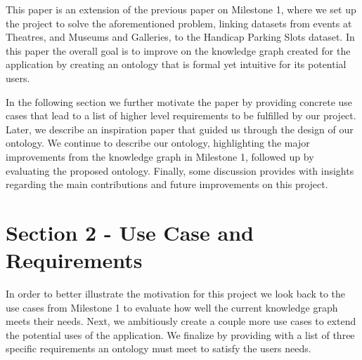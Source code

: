 \documentclass[runningheads,a4paper]{../../StyleFiles/llncs}
\begin{document}
This paper is an extension of the previous paper on Milestone 1, where we set up the project to solve the aforementioned problem, linking datasets from events at Theatres, and Museums and Galleries, to the Handicap Parking Slots dataset. In this paper the overall goal is to improve on the knowledge graph created for the application by creating an ontology that is formal yet intuitive for its potential users.

In the following section we further motivate the paper by providing concrete use cases that lead to a list of higher level requirements to be fulfilled by our project. Later, we describe an inspiration paper that guided us through the design of our ontology. We continue to describe our ontology, highlighting the major improvements from the knowledge graph in Milestone 1, followed up by evaluating the proposed ontology. Finally, some discussion provides with insights regarding the main contributions and future improvements on this project.

\section{Section 2 - Use Case and Requirements}
In order to better illustrate the motivation for this project we look back to the use cases from Milestone 1 to evaluate how well the current knowledge graph meets their needs. Next, we ambitiously create a couple more use cases to extend the potential uses of the application. We finalize by providing with a list of three specific requirements an ontology must meet to satisfy the users needs.
\end{document}
